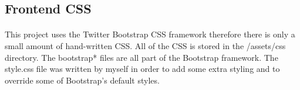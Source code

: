 \documentclass[10pt]{report}
\begin{document}
	\subsection*{Frontend CSS}
	\paragraph{}
	This project uses the Twitter Bootstrap CSS framework therefore there is only a small amount of
	hand-written CSS.  All of the CSS is stored in the /assets/css directory.  The bootstrap* files are
	all part of the Bootstrap framework.  The style.css file was written by myself in order to add some
	extra styling and to override some of Bootstrap's default styles.
\end{document}
